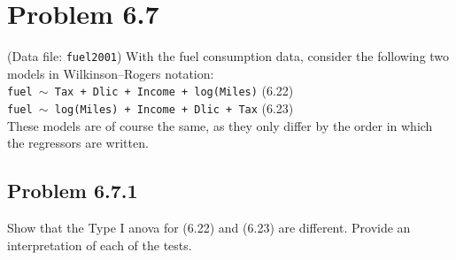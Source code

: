\documentclass[12pt,oneside,a4paper]{article}\usepackage[]{graphicx}\usepackage[]{xcolor}
\title{\hmwkTitle}
\author{\hmwkAuthorName}
\date{\today}
\newcommand{\problem}[1]
{
    \clearpage
    \section*{Problem {#1}}
}
\newcommand{\subproblem}[1]
{
    \subsection*{Problem {#1}}
}
\newcommand{\m}[1]{\texttt{{#1}}}
\begin{document}
\maketitle



\problem{6.7}
(Data file: \m{fuel2001}) With the fuel consumption data, consider the following two models in Wilkinson–Rogers notation:\\

\m{fuel $\sim$ Tax + Dlic + Income + log(Miles)} \hspace{50pt}     (6.22)\\
\m{fuel $\sim$ log(Miles) + Income + Dlic + Tax} \hspace{50pt}     (6.23)\\

These models are of course the same, as they only differ by the order in which the regressors are written.

\subproblem{6.7.1}
Show that the Type I anova for (6.22) and (6.23) are different. Provide an interpretation of each of the tests.
\end{document}
